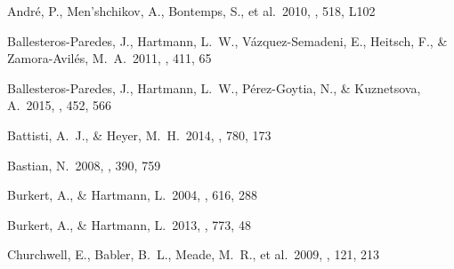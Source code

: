 \begin{thebibliography}

 Andr{\'e}, P., Men'shchikov, A., Bontemps, S., et al.\ 2010, \aap, 518, L102 



Ballesteros-Paredes, J., Hartmann, L.~W., V{\'a}zquez-Semadeni, E., 
Heitsch, F., \& Zamora-Avil{\'e}s, M.~A.\ 2011, \mnras, 411, 65 


Ballesteros-Paredes, J., Hartmann, L.~W., P{\'e}rez-Goytia, N., 
\& Kuznetsova, A.\ 2015, \mnras, 452, 566 


 Battisti, A.~J., \& Heyer, M.~H.\ 2014, \apj, 780, 173 


 Bastian, N.\ 2008, \mnras, 390, 759








 Burkert, A., \& Hartmann, L.\ 2004, \apj, 616, 288


 Burkert, A., \& Hartmann, L.\ 2013, \apj, 773, 48


 Churchwell, E., 
Babler, B.~L., Meade, M.~R., et al.\ 2009, \pasp, 121, 213 



\end{thebibliography}
